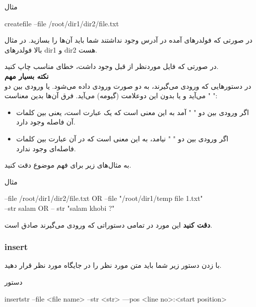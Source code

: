 \documentclass[]{article}
\begin{document}
\begin{mybox}[colback=yellow]{مثال}
	\begin{latin}	
		createfile --file /root/dir1/dir2/file.txt
	\end{latin}
\end{mybox}

در صورتی که فولدرهای آمده در آدرس وجود نداشتند شما باید آن‌ها را بسازید. در مثال بالا فولدرهای dir1 و dir2 هست.

در صورتی که فایل موردنظر از قبل وجود داشت، خطای مناسب چاپ کنید.\\

\textbf{نکته بسیار مهم}\\

در دستورهایی که ورودی می‌گیرند، به دو صورت ورودی داده می‌شود. یا ورودی بین دو " " می‌آید و یا بدون این دوعلامت (گیومه) می‌آید. فرق آن‌ها بدین معناست:

\begin{itemize}
\item
اگر ورودی بین دو " " آمد به این معنی است که یک عبارت است، یعنی بین کلمات آن فاصله وجود دارد.

\item
اگر ورودی بین دو " " نیامد، به این معنی است که در آن عبارت بین کلمات فاصله‌ای وجود ندارد.
\end{itemize}

به مثال‌های زیر برای فهم موضوع دقت کنید.\\

\begin{mybox}[colback=yellow]{مثال}
	\begin{latin}	
		--file /root/dir1/dir2/file.txt OR --file "/root/dir1/temp file 1.txt"\\
            --str salam OR -- str "salam khobi ?"
	\end{latin}
\end{mybox}

\textbf{دقت کنید}
این مورد در تمامی دستوراتی که ورودی می‌گیرند صادق است.

\subsubsection*{{\titr insert}}

با زدن دستور زیر شما باید متن مورد نظر را در جایگاه مورد نظر قرار دهید.

\begin{mybox}[colback=yellow]{دستور}
	\begin{latin}	
		insertstr --file <file name> --str <str> ---pos <line no>:<start position>
	\end{latin}
\end{mybox}
\end{document}
